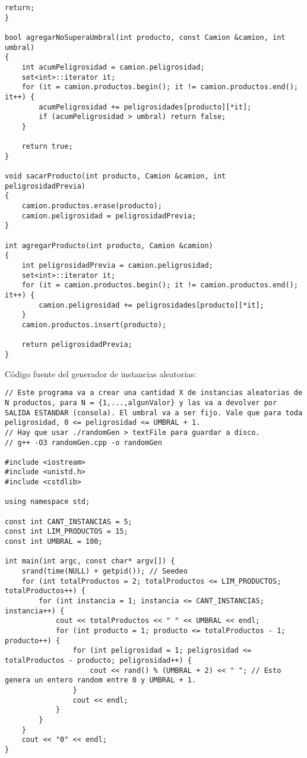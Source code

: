 \begin{lstlisting}[frame=single]
    return;
}

bool agregarNoSuperaUmbral(int producto, const Camion &camion, int umbral)
{
    int acumPeligrosidad = camion.peligrosidad;
    set<int>::iterator it;
    for (it = camion.productos.begin(); it != camion.productos.end(); it++) {
        acumPeligrosidad += peligrosidades[producto][*it];
        if (acumPeligrosidad > umbral) return false;
    }
    
    return true;
}

void sacarProducto(int producto, Camion &camion, int peligrosidadPrevia)
{
    camion.productos.erase(producto);
    camion.peligrosidad = peligrosidadPrevia;
}

int agregarProducto(int producto, Camion &camion)
{
    int peligrosidadPrevia = camion.peligrosidad;
    set<int>::iterator it;
    for (it = camion.productos.begin(); it != camion.productos.end(); it++) {
        camion.peligrosidad += peligrosidades[producto][*it];
    }
    camion.productos.insert(producto);
    
    return peligrosidadPrevia;
}
\end{lstlisting}

Código fuente del generador de instancias aleatorias:
\begin{lstlisting}[frame=single]
// Este programa va a crear una cantidad X de instancias aleatorias de N productos, para N = {1,...,algunValor} y las va a devolver por SALIDA ESTANDAR (consola). El umbral va a ser fijo. Vale que para toda peligrosidad, 0 <= peligrosidad <= UMBRAL + 1.
// Hay que usar ./randomGen > textFile para guardar a disco.
// g++ -O3 randomGen.cpp -o randomGen

#include <iostream>
#include <unistd.h>
#include <cstdlib>

using namespace std;

const int CANT_INSTANCIAS = 5;
const int LIM_PRODUCTOS = 15;
const int UMBRAL = 100;

int main(int argc, const char* argv[]) {
    srand(time(NULL) + getpid()); // Seedeo
    for (int totalProductos = 2; totalProductos <= LIM_PRODUCTOS; totalProductos++) {
        for (int instancia = 1; instancia <= CANT_INSTANCIAS; instancia++) {
            cout << totalProductos << " " << UMBRAL << endl;
            for (int producto = 1; producto <= totalProductos - 1; producto++) {
                for (int peligrosidad = 1; peligrosidad <= totalProductos - producto; peligrosidad++) {
                    cout << rand() % (UMBRAL + 2) << " "; // Esto genera un entero random entre 0 y UMBRAL + 1.
                }
                cout << endl;
            }
        }
    }
    cout << "0" << endl;
}
\end{lstlisting}

